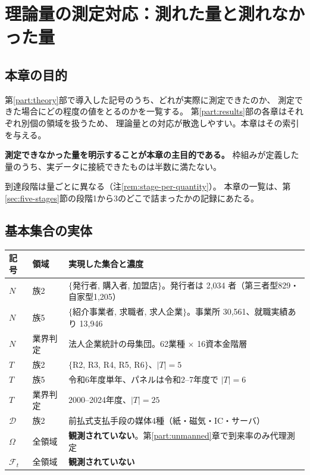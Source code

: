 \chapter{理論量の測定対応：測れた量と測れなかった量}
\label{ch:instantiation}

\section{本章の目的}

第\ref{part:theory}部で導入した記号のうち、どれが実際に測定できたのか、
測定できた場合にどの程度の値をとるのかを一覧する。
第\ref{part:results}部の各章はそれぞれ別個の領域を扱うため、
理論量との対応が散逸しやすい。本章はその索引を与える。

\textbf{測定できなかった量を明示することが本章の主目的である。}
枠組みが定義した量のうち、実データに接続できたものは半数に満たない。

到達段階は量ごとに異なる（注\ref{rem:stage-per-quantity}）。
本章の一覧は、第\ref{sec:five-stages}節の段階1から3のどこで詰まったかの記録にあたる。

\section{基本集合の実体}

\begin{center}
\begin{tabularx}{\textwidth}{@{}llX@{}}
\toprule
記号 & 領域 & 実現した集合と濃度 \\
\midrule
$N$ & 族2 & $\{$発行者, 購入者, 加盟店$\}$。発行者は 2,034 者（第三者型829・自家型1,205） \\
$N$ & 族5 & $\{$紹介事業者, 求職者, 求人企業$\}$。事業所 30,561、就職実績あり 13,946 \\
$N$ & 業界判定 & 法人企業統計の母集団。62業種 $\times$ 16資本金階層 \\
$T$ & 族2 & $\{$R2, R3, R4, R5, R6$\}$、$|T|=5$ \\
$T$ & 族5 & 令和6年度単年、パネルは令和2--7年度で $|T|=6$ \\
$T$ & 業界判定 & 2000--2024年度、$|T|=25$ \\
$\mathcal{D}$ & 族2 & 前払式支払手段の媒体4種（紙・磁気・IC・サーバ） \\
$\Omega$ & 全領域 & \textbf{観測されていない}。第\ref{part:unmanned}章で到来率のみ代理測定 \\
$\mathcal{F}_t$ & 全領域 & \textbf{観測されていない} \\
\bottomrule
\end{tabularx}
\label{tab:basic-sets}
\end{center}

